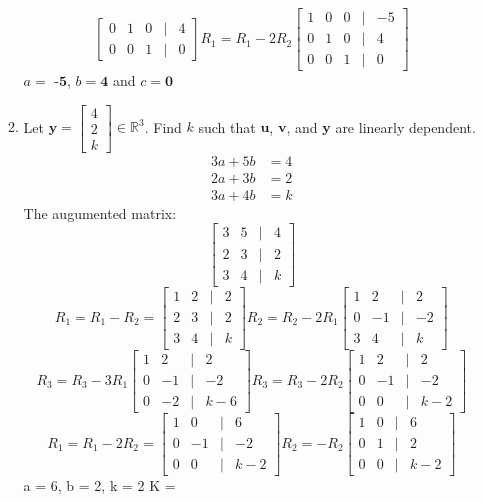 \documentclass[11pt]{article}
\begin{document}
\begin{enumerate}
\begin{enumerate}
\[\begin{bmatrix}
    0 & 1 & 0 &|& 4 \\
    0 & 0 & 1 &|& 0
\end{bmatrix}
R_1 = R_1 - 2R_2
\begin{bmatrix}
    1 & 0 & 0 &|& -5 \\
    0 & 1 & 0 &|& 4 \\
    0 & 0 & 1 &|& 0
\end{bmatrix}
\]
\( a =\textbf{ -5} \), \( b = \textbf{4} \) and \( c = \textbf{0} \)
\item  Let \( \mathbf{y} = \begin{bmatrix} 4 \\ 2 \\ k \end{bmatrix} \in \mathbb{R}^3 \). Find \( k \) such that \( \mathbf{u} \), \( \mathbf{v} \), and \( \mathbf{y} \) are linearly dependent.
\[
\begin{aligned}
    3a + 5b  &= 4 \\
    2a + 3b  &= 2 \\
    3a + 4b  &= k
\end{aligned}
\]
The augumented matrix:
\[
\begin{bmatrix}
    3 & 5 & | & 4 \\
    2 & 3 &|&2 \\
    3 & 4 &|& k
\end{bmatrix}
\]
\[
R_1 = R_1 - R_2 =
\begin{bmatrix}
    1 & 2 &|& 2 \\
    2 & 3 &|& 2 \\
    3 & 4 &|& k
\end{bmatrix}
R_2 = R_2 - 2R_1
\begin{bmatrix}
    1 & 2 &|& 2 \\
    0 & -1 &|& -2 \\
    3 & 4 &|& k
\end{bmatrix}
\]
\[
R_3 = R_3 - 3R_1
\begin{bmatrix}
    1 & 2 &|& 2 \\
    0 & -1 &|& -2 \\
    0 & -2 &|& k - 6
\end{bmatrix}
R_3 = R_3 - 2R_2
\begin{bmatrix}
    1 & 2 &|& 2 \\
    0 & -1 &|& -2 \\
    0 & 0 &|& k - 2
\end{bmatrix}
\]
\[
R_1 = R_1 - 2R_2 = 
\begin{bmatrix}
    1 & 0 &|& 6 \\
    0 & -1 &|& -2 \\
    0 & 0 &|& k - 2
\end{bmatrix}
R_2 = -R_2
\begin{bmatrix}
    1 & 0 &|& 6 \\
    0 & 1 &|& 2 \\
    0 & 0 &|& k - 2
\end{bmatrix}
\]
a = 6, b = 2, k = 2
K = 


\end{enumerate}
\end{enumerate}
\end{document}
